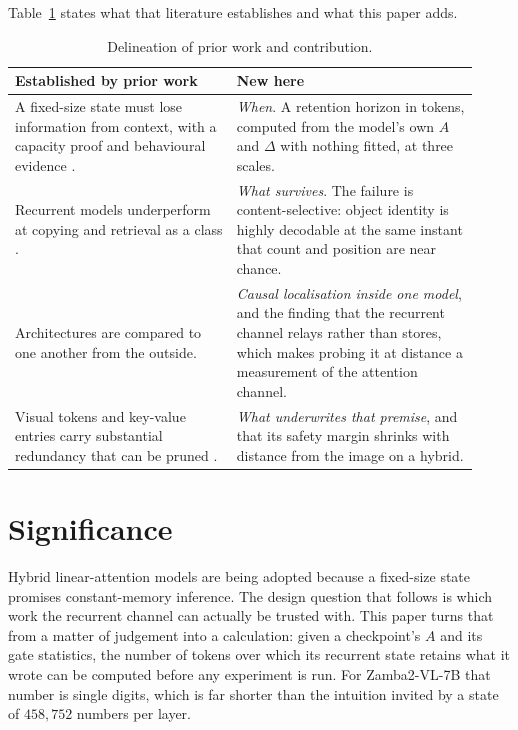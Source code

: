 \documentclass[11pt]{article}
\begin{document}
Table~\ref{tab:novelty} states what that literature establishes and what this
paper adds.

\begin{table}[h]
\centering\small
\begin{tabular}{p{0.44\linewidth}p{0.48\linewidth}}
\toprule
\textbf{Established by prior work} & \textbf{New here} \\
\midrule
A fixed-size state must lose information from context, with a capacity proof
and behavioural evidence \cite{jelassi2024copying,merrill2024illusion,wen2024rnns}.
& \emph{When}. A retention horizon in tokens, computed from the model's own
$A$ and $\Delta$ with nothing fitted, at three scales. \\
\addlinespace
Recurrent models underperform at copying and retrieval as a class
\cite{arora2023zoology,arora2024based}.
& \emph{What survives}. The failure is content-selective: object identity is
highly decodable at the same instant that count and position are near chance. \\
\addlinespace
Architectures are compared to one another from the outside.
& \emph{Causal localisation inside one model}, and the finding that the
recurrent channel relays rather than stores, which makes probing it at distance
a measurement of the attention channel. \\
\addlinespace
Visual tokens and key-value entries carry substantial redundancy that can be
pruned \cite{chen2024fastv,yang2024visionzip,shang2025prumerge}.
& \emph{What underwrites that premise}, and that its safety margin shrinks
with distance from the image on a hybrid. \\
\bottomrule
\end{tabular}
\caption{Delineation of prior work and contribution.}
\label{tab:novelty}
\end{table}

\section{Significance}

Hybrid linear-attention models are being adopted because a fixed-size state
promises constant-memory inference. The design question that follows is which
work the recurrent channel can actually be trusted with. This paper turns that
from a matter of judgement into a calculation: given a checkpoint's $A$ and its
gate statistics, the number of tokens over which its recurrent state retains
what it wrote can be computed before any experiment is run. For Zamba2-VL-7B
that number is single digits, which is far shorter than the intuition invited by
a state of $458{,}752$ numbers per layer.
\end{document}
